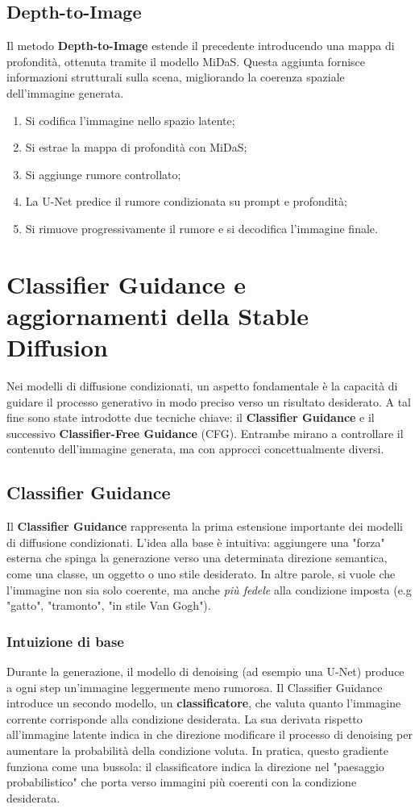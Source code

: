 \subsection{Depth-to-Image}
Il metodo \textbf{Depth-to-Image} estende il precedente introducendo una mappa di profondità, ottenuta tramite il modello MiDaS. Questa aggiunta fornisce informazioni strutturali sulla scena, migliorando la coerenza spaziale dell’immagine generata.

\begin{enumerate}
    \item Si codifica l’immagine nello spazio latente;
    \item Si estrae la mappa di profondità con MiDaS;
    \item Si aggiunge rumore controllato;
    \item La U-Net predice il rumore condizionata su prompt e profondità;
    \item Si rimuove progressivamente il rumore e si decodifica l’immagine finale.
\end{enumerate}

\section{Classifier Guidance e aggiornamenti della Stable Diffusion}
Nei modelli di diffusione condizionati, un aspetto fondamentale è la capacità di guidare il processo generativo in modo preciso verso un risultato desiderato. A tal fine sono state introdotte due tecniche chiave: il \textbf{Classifier Guidance} e il successivo \textbf{Classifier-Free Guidance} (CFG). Entrambe mirano a controllare il contenuto dell’immagine generata, ma con approcci concettualmente diversi.  

\subsection{Classifier Guidance}
Il \textbf{Classifier Guidance} rappresenta la prima estensione importante dei modelli di diffusione condizionati. L’idea alla base è intuitiva: aggiungere una "forza" esterna che spinga la generazione verso una determinata direzione semantica, come una classe, un oggetto o uno stile desiderato. In altre parole, si vuole che l’immagine non sia solo coerente, ma anche \textit{più fedele} alla condizione imposta (e.g "gatto", "tramonto", "in stile Van Gogh").

\subsubsection{Intuizione di base}
Durante la generazione, il modello di denoising (ad esempio una U-Net) produce a ogni step un’immagine leggermente meno rumorosa. Il Classifier Guidance introduce un secondo modello, un \textbf{classificatore}, che valuta quanto l’immagine corrente corrisponde alla condizione desiderata. La sua derivata rispetto all’immagine latente indica in che direzione modificare il processo di denoising per aumentare la probabilità della condizione voluta. In pratica, questo gradiente funziona come una bussola: il classificatore indica la direzione nel "paesaggio probabilistico" che porta verso immagini più coerenti con la condizione desiderata.

